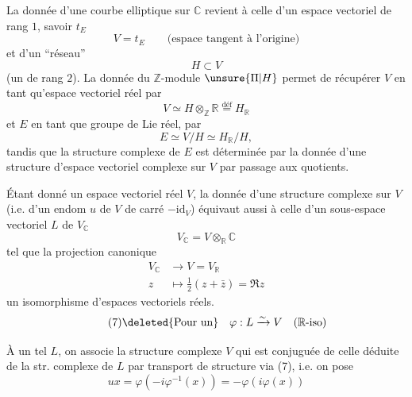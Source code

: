 La donnée d'une courbe elliptique  sur $\mathbb C$ revient à celle  d'un  espace vectoriel de rang $1$, savoir $t_E$
\[
\tag{1}
V=t_E\qquad\text{(espace tangent à l'origine)}
\]
et d'un ``réseau''
\[
\tag{2}
H\subset V
\]
(un     de rang $2$). La donnée du  $\mathbb Z$-module $\unsure{\Pi|H}$ permet de récupérer $V$ en tant qu'espace vectoriel réel  par
\[
\tag{3}
V\simeq H\otimes_{\mathbb Z}\mathbb R\overset{\text{déf}}=H_{\mathbb R}
\]
et $E$ en tant que groupe de Lie réel, par
\[
\tag{4}
E\simeq V/H\simeq H_{\mathbb R}/H,
\]
tandis que la structure complexe de $E$ est déterminée par la donnée d'une structure d'espace vectoriel complexe sur $V$ par passage aux quotients.

Étant donné un espace vectoriel réel $V$,  la donnée d'une structure complexe sur $V$ (i.e. d'un endom $u$ de $V$ de carré $-\mathrm{id}_V$) équivaut aussi à celle d'un sous-espace vectoriel $L$ de $V_{\mathbb C}$
\[
\tag{5}
V_{\mathbb C}=V\otimes_{\mathbb R}\mathbb C
\]
tel que la projection canonique
\[
\tag{6}
\begin{aligned}
V_{\mathbb C}&\longrightarrow V=V_{\mathbb R}\\
z&\longmapsto\tfrac12(z+\bar z)=\Re z
\end{aligned}
\]
  un isomorphisme d'espaces vectoriels réels.
\[
\tag{7}
\deleted{\text{Pour un}}\quad\varphi:L\xrightarrow{\sim}V\quad(\mathbb R\text{-iso})
\]

À un tel $L$, on associe la structure complexe
$V$ qui est conjuguée de celle déduite de la str. complexe de $L$ par transport de structure via (7), i.e. on pose
\[
\tag{8}
ux=\varphi(-i\varphi^{-1}(x))=-\varphi(i\varphi(x))
\]

